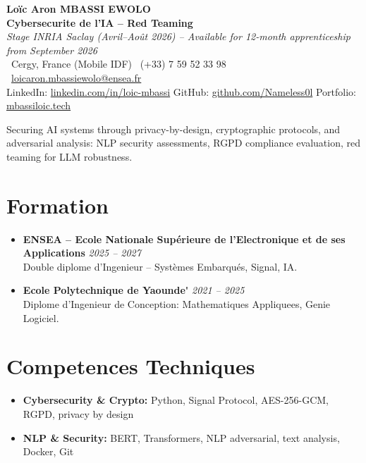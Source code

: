 \documentclass[a4paper,11pt]{article}
\begin{document}
\begin{center}
    {\Large \textbf{Lo\"ic Aron MBASSI EWOLO}} \\ \vspace{4pt}
    \textbf{\large Cybersecurite de l'IA -- Red Teaming} \\
    \textit{\small Stage INRIA Saclay (Avril--Ao\^ut 2026) -- Available for 12-month apprenticeship from September 2026} \\ \vspace{4pt}
    \small
    \Pointinghand\ Cergy, France (Mobile IDF) \quad
    \Mobilefone\ (+33) 7 59 52 33 98 \quad
    {\color{primary}\Letter\ \href{mailto:loicaron.mbassiewolo@ensea.fr}{loicaron.mbassiewolo@ensea.fr}} \\ \vspace{2pt}
    {\color{primary}LinkedIn: \href{https://www.linkedin.com/in/loic-mbassi/}{linkedin.com/in/loic-mbassi}} \quad
    {\color{primary}GitHub: \href{https://github.com/Nameless0l}{github.com/Nameless0l}} \quad
    {\color{primary}Portfolio: \href{https://mbassiloic.tech}{mbassiloic.tech}}
\end{center}

\vspace{-6pt}

\noindent\small{Securing AI systems through privacy-by-design, cryptographic protocols, and adversarial analysis: NLP security assessments, RGPD compliance evaluation, red teaming for LLM robustness.}

\section{Formation}
\begin{itemize}[leftmargin=*, label=\tiny$\bullet$, nosep]
    \item \textbf{ENSEA -- Ecole Nationale Sup\'erieure de l'Electronique et de ses Applications} \hfill \textit{2025 -- 2027} \\
    \small{Double diplome d'Ingenieur -- Syst\`emes Embarqu\'es, Signal, IA.}
    \item \textbf{Ecole Polytechnique de Yaounde\'} \hfill \textit{2021 -- 2025} \\
    \small{Diplome d'Ingenieur de Conception: Mathematiques Appliquees, Genie Logiciel.}
\end{itemize}

\section{Competences Techniques}
\begin{itemize}[leftmargin=*, nosep]
    \item \small{\textbf{Cybersecurity \& Crypto:} Python, Signal Protocol, AES-256-GCM, RGPD, privacy by design}
    \item \small{\textbf{NLP \& Security:} BERT, Transformers, NLP adversarial, text analysis, Docker, Git}
\end{itemize}
\end{document}
